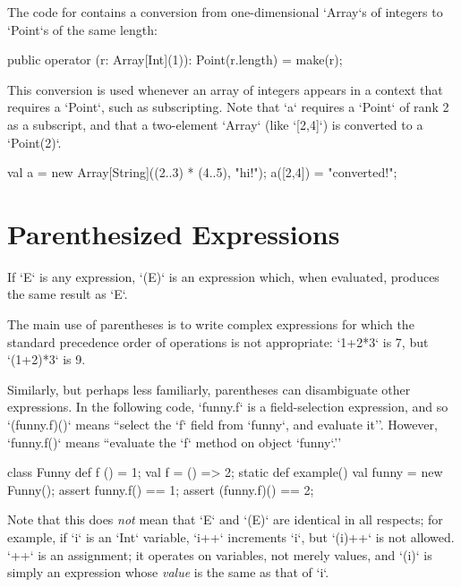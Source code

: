 \begin{ex}
The code for  contains a conversion from 
one-dimensional \xcd`Array`s of integers to \xcd`Point`s of the same length: 
\begin{xten}
  public operator (r: Array[Int](1)): Point(r.length) 
         = make(r);
\end{xten}
This conversion is used whenever an array of integers appears in a 
context that requires a \xcd`Point`, such as subscripting. Note 
that \xcd`a` requires a \xcd`Point` of rank 2 as a subscript, and that 
a two-element \xcd`Array` (like \xcd`[2,4]`) is converted to a 
\xcd`Point(2)`.
% 
\begin{xten}
val a = new Array[String]((2..3) * (4..5), "hi!");
a([2,4]) = "converted!";
\end{xten}


\end{ex}

\section{Parenthesized Expressions}

If \xcd`E` is any expression, \xcd`(E)` is an expression which, when
evaluated, produces the same result as \xcd`E`.   

\begin{ex}
The main use of parentheses is to write complex expressions for which the 
standard precedence order of operations is not appropriate: \xcd`1+2*3` is 7,
but \xcd`(1+2)*3` is 9.  

Similarly, but perhaps less familiarly, 
parentheses can disambiguate other expressions.  In the following code, 
\xcd`funny.f` is a field-selection expression, and so \xcd`(funny.f)()` means
``select the \xcd`f` field from \xcd`funny`, and evaluate it''.  However, 
\xcd`funny.f()` means ``evaluate the \xcd`f` method on object \xcd`funny`.''  
\begin{xten}
class Funny {
  def f () = 1;
  val f = () => 2;
  static def example() {
    val funny = new Funny();
    assert funny.f() == 1;
    assert (funny.f)() == 2;
  }
}
\end{xten}


\end{ex}

Note that this does {\em
not} mean that \xcd`E` and \xcd`(E)` are identical in all respects; for
example, if \xcd`i` is an \xcd`Int` variable, \xcd`i++` increments \xcd`i`,
but \xcd`(i)++` is not allowed.    \xcd`++` is an assignment; it operates on
variables, not merely values, and \xcd`(i)` is simply an expression whose {\em
value} is the same as that of \xcd`i`. 
